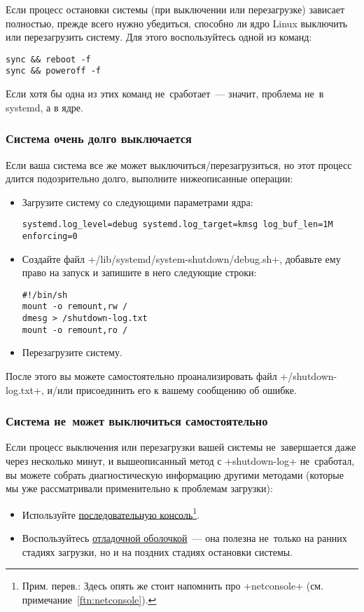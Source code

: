 \documentclass[10pt,oneside,a4paper]{article}
\begin{document}
Если процесс остановки системы (при выключении или перезагрузке) зависает
полностью, прежде всего нужно убедиться, способно ли ядро Linux выключить или
перезагрузить систему. Для этого воспользуйтесь одной из команд:
\begin{Verbatim}
sync && reboot -f
sync && poweroff -f
\end{Verbatim}

Если хотя бы одна из этих команд не~сработает~--- значит, проблема не~в systemd,
а в ядре.

\subsubsection{Система очень долго выключается}

Если ваша система все же может выключиться/перезагрузиться, но этот процесс
длится подозрительно долго, выполните нижеописанные операции:
\begin{itemize}
	\item Загрузите систему со следующими параметрами ядра:
\begin{Verbatim}
systemd.log_level=debug systemd.log_target=kmsg log_buf_len=1M enforcing=0
\end{Verbatim}
	
	\item Создайте файл +/lib/systemd/system-shutdown/debug.sh+, добавьте
		ему право на запуск и запишите в него следующие строки:
\begin{Verbatim}
#!/bin/sh
mount -o remount,rw /
dmesg > /shutdown-log.txt
mount -o remount,ro /
\end{Verbatim}
	
	\item Перезагрузите систему.
\end{itemize}

После этого вы можете самостоятельно проанализировать файл +/shutdown-log.txt+,
и/или присоединить его к вашему сообщению об ошибке.

\subsubsection{Система не~может выключиться самостоятельно}

Если процесс выключения или перезагрузки вашей системы не~завершается даже через
несколько минут, и вышеописанный метод с +shutdown-log+ не~сработал, вы можете
собрать диагностическую информацию другими методами (которые мы уже
рассматривали применительно к проблемам загрузки):
\begin{itemize}
	\item Используйте \hyperlink{it:serial}{последовательную
		консоль}\footnote{Прим. перев.: Здесь опять же стоит напомнить
		про +netconsole+ (см. примечание~\ref{ftn:netconsole}).}.
	\item Воспользуйтесь \hyperlink{it:dbgshell}{отладочной оболочкой}~---
		она полезна не~только на ранних стадиях загрузки, но и на
		поздних стадиях остановки системы. 
\end{itemize}
\end{document}
